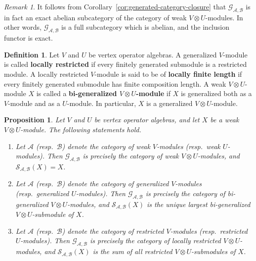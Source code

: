 \documentclass[12pt, english]{article}
\numberwithin{equation}{section}
\theoremstyle{plain}
\newtheorem{proposition}[lemma]{Proposition}
\theoremstyle{definition}
\newtheorem{definition}[lemma]{Definition}
\theoremstyle{remark}
\newtheorem{remark}[lemma]{Remark}
\begin{document}
	\begin{remark}
		It follows from Corollary~\ref{cor:generated-category-closure} that $\mathcal{G}_{\mathcal{A}, \mathcal{B}}$
		is in fact an exact abelian subcategory of the category of weak $V\otimes U$-modules.
		In other words, $\mathcal{G}_{\mathcal{A}, \mathcal{B}}$ is a full subcategory which is abelian, and the inclusion functor is exact.
	\end{remark}
	
	
	\begin{definition}
		Let $V$ and $U$ be vertex operator algebras.
		A generalized $V$-module is called \textbf{locally restricted} if every finitely generated submodule is a restricted module.
		A locally restricted $V$-module is said to be of \textbf{locally finite length} if every finitely generated submodule has finite composition length.
		A weak $V\otimes U$-module $X$ is called a \textbf{bi-generalized $V\otimes U$-module} if $X$ is generalized both as a $V$-module and as a $U$-module.
		In particular, $X$ is a generalized $V\otimes U$-module. 
	\end{definition}
	
	
	\begin{proposition} \label{prop:generated-category-characterizations}
		Let $V$ and $U$ be vertex operator algebras, and let $X$ be a weak $V\otimes U$-module. The following statements hold.
		\begin{enumerate}[label=(\arabic*),ref=\arabic*]
			\item Let $\mathcal{A}$ (resp.\ $\mathcal{B}$) denote the category of weak $V$-modules (resp.\ weak $U$-modules).
			Then $\mathcal{G}_{\mathcal{A}, \mathcal{B}}$ is precisely the category of weak $V\otimes U$-modules, and $\mathcal{S}_{\mathcal{A}, \mathcal{B}}(X) = X$.
			
			\item Let $\mathcal{A}$ (resp.\ $\mathcal{B}$) denote the category of generalized $V$-modules (resp.\ generalized $U$-modules).
			Then $\mathcal{G}_{\mathcal{A}, \mathcal{B}}$ is precisely the category of bi-generalized $V\otimes U$-modules,
			and $\mathcal{S}_{\mathcal{A}, \mathcal{B}}(X)$ is the unique largest bi-generalized $V\otimes U$-submodule of $X$.
			
			\item Let $\mathcal{A}$ (resp.\ $\mathcal{B}$) denote the category of restricted $V$-modules (resp.\ restricted $U$-modules).
			Then $\mathcal{G}_{\mathcal{A}, \mathcal{B}}$ is precisely the category of locally restricted $V\otimes U$-modules,
			and $\mathcal{S}_{\mathcal{A}, \mathcal{B}}(X)$ is the sum of all restricted $V\otimes U$-submodules of $X$.
			
		\end{enumerate}
	\end{proposition}
	
\end{document}
